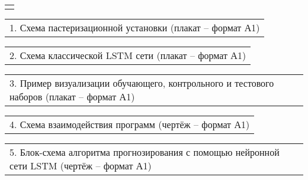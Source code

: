 \documentclass[12pt, А4, twoside]{article}
\begin{document}
\begin{FlushLeft}
    \begin{tabular}{p{17.25cm}}
        \vspace{0pt} \hline \\
    \end{tabular}

    \vspace{-0.1 cm}

    \begin{tabular}{p{17.25cm}}
        \hspace{0.3cm} \textsf{1. Схема пастеризационной установки (плакат {--} формат А1)} \vspace{0pt} \hline  \\
    \end{tabular}

    \vspace{-0.1 cm}

    \begin{tabular}{p{17.25cm}}
        \hspace{0.3cm} \textsf{2. Схема классической LSTM сети (плакат {--} формат А1)} \vspace{0pt} \hline  \\
    \end{tabular}

    \vspace{-0.1 cm}

    \begin{tabular}{p{17.25cm}}
        \hspace{0.3cm} \textsf{3. Пример визуализации обучающего, контрольного и тестового наборов (плакат {--} формат А1)} \vspace{0pt} \hline  \\
    \end{tabular}

    \vspace{-0.1 cm}

    \begin{tabular}{p{17.25cm}}
        \hspace{0.3cm} \textsf{4. Схема взаимодействия программ (чертёж {--} формат А1)} \vspace{0pt} \hline  \\
    \end{tabular}

    \vspace{-0.1 cm}

    \begin{tabular}{p{17.25cm}}
        \hspace{0.3cm} \textsf{5. Блок-схема алгоритма прогнозирования с помощью нейронной сети LSTM (чертёж {--} формат А1)} \vspace{0pt} \hline  \\
    \end{tabular}


\end{FlushLeft}
\end{document}
